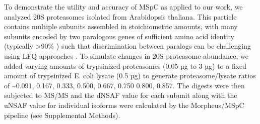To demonstrate the utility and accuracy of MSpC as applied to our work, we analyzed 20S proteasomes isolated from Arabidopsis thaliana.
This particle contains multiple subunits assembled in stoichiometric amounts, with many subunits encoded by two paralogous genes of sufficient amino acid identity (typically >90\% \citep{yang04}) such that discrimination between paralogs can be challenging using LFQ approaches \citep{book10}.
To simulate changes in 20S proteasome abundance, we added varying amounts of trypsinized proteasomes (0.05 µg to 3 µg) to a fixed amount of trypsinized E. coli lysate (0.5 µg) to generate proteasome/lysate ratios of \textasciitilde0.091, 0.167, 0.333, 0.500, 0.667, 0.750 0.800, 0.857.
The digests were then subjected to MS/MS and the dNSAF value for each subunit along with the uNSAF value for individual isoforms were calculated by the Morpheus/MSpC pipeline (see Supplemental Methods).
